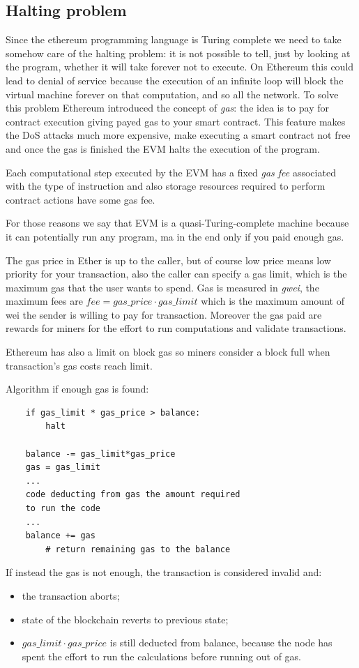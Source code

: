 \subsection{Halting problem}
Since the ethereum programming language is Turing complete we need to take somehow care of the halting problem: it is not possible to tell, just by looking at the program, whether it will take forever not to execute.
On Ethereum this could lead to  denial of service because the execution of an infinite loop will block the virtual machine forever on that computation, and so all the network.
To solve this problem Ethereum introduced the concept of \emph{gas}: the idea is to pay for contract execution giving payed gas to your smart contract.
This feature makes the DoS attacks much more expensive, make executing a smart contract not free and once the gas is finished the EVM halts the execution of the program.

Each computational step executed by the EVM has a fixed \emph{gas fee} associated with the type of instruction and also storage resources required to perform contract actions have some gas fee.

For those reasons we say that EVM is a quasi-Turing-complete machine because it can potentially run any program, ma in the end only if you paid enough gas.

The gas price in Ether is up to the caller, but of course low price means low priority for your transaction, also the caller can specify a gas limit, which is the maximum gas that the user wants to spend.
Gas is measured in \emph{gwei}, the maximum fees are $fee = gas\_price \cdot gas\_limit$ which is the maximum amount of wei the sender is willing to pay for transaction.
Moreover the gas paid are rewards for miners for the effort to run computations and validate transactions.

Ethereum has also a limit on block gas so miners consider a block full when transaction's gas costs reach limit.

Algorithm if enough gas is found:
\begin{verbatim}
    if gas_limit * gas_price > balance:
        halt

    balance -= gas_limit*gas_price
    gas = gas_limit
    ...
    code deducting from gas the amount required
    to run the code
    ...
    balance += gas
        # return remaining gas to the balance
\end{verbatim}

If instead the gas is not enough, the transaction is considered invalid and:
\begin{itemize}
    \item the transaction aborts;
    \item state of the blockchain reverts to previous state;
    \item $gas\_limit \cdot gas\_price$ is still deducted from balance, because the node has spent the effort to run the calculations before running out of gas.
\end{itemize}

